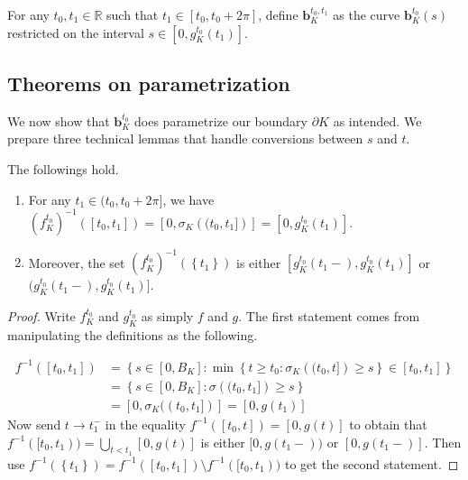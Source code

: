 \begin{definition}

For any \(t_0, t_1 \in \mathbb{R}\) such that \(t_1 \in [t_0, t_0 + 2 \pi]\), define \(\mathbf{b}_{K}^{t_0, t_1}\) as the curve \(\mathbf{b}_{K}^{t_0} (s)\) restricted on the interval \(s \in [0, g_{K}^{t_0}(t_1)]\).

\label{def:boundary-segment-parametrization}
\end{definition}

\subsection{Theorems on parametrization}

We now show that \(\mathbf{b}_K^{t_0}\) does parametrize our boundary \(\partial K\) as intended. We prepare three technical lemmas that handle conversions between \(s\) and \(t\).

\begin{lemma}

The followings hold.

\begin{enumerate}
\def\labelenumi{\arabic{enumi}.}
\tightlist
\item
  For any \(t_1 \in (t_0, t_0 + 2\pi]\), we have \(\left(f_{K}^{t_0}\right)^{-1}([t_0, t_1]) = [0, \sigma_K\left( (t_0, t_1] \right)] = [0, g_{K}^{t_0}(t_1)]\).
\item
  Moreover, the set \(\left( f_{K}^{t_0} \right)^{-1} (\left\{ t_1 \right\})\) is either \([g_{K}^{t_0}(t_1-), g_{K}^{t_0}(t_1)]\) or \((g_{K}^{t_0}(t_1-), g_{K}^{t_0}(t_1)]\).
\end{enumerate}

\label{lem:parametrization-set-calculation}
\end{lemma}

\begin{proof}
Write \(f_K^{t_0}\) and \(g_K^{t_0}\) as simply \(f\) and \(g\). The first statement comes from manipulating the definitions as the following.

\begin{align*}
f^{-1}([t_0, t_1]) & = \left\{ s \in [0, B_K] : \min \left\{ t \geq t_0 : \sigma_K\left( (t_0, t] \right) \geq s \right\} \in [t_0, t_1] \right\} \\
& = \left\{ s \in [0, B_K] :  \sigma\left( (t_0, t_1] \right) \geq s \right\} \\
& = [0, \sigma_K((t_0, t_1])] = [0, g(t_1)]
\end{align*}
Now send \(t \to t_1^-\) in the equality \(f^{-1}([t_0, t]) = [0, g(t)]\) to obtain that \(f^{-1}([t_0, t_1)) = \bigcup_{t < t_1} [0, g(t)]\) is either \([0, g(t_1-))\) or \([0, g(t_1-)]\). Then use \(f^{-1} (\left\{ t_1 \right\}) = f^{-1}([t_0, t_1]) \setminus f^{-1}([t_0, t_1))\) to get the second statement.
\end{proof}

